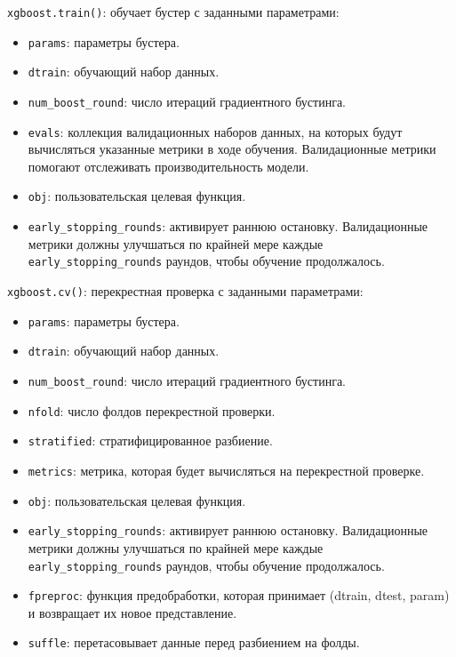 \documentclass[%
	11pt,
	a4paper,
	utf8,
		]{article}
\begin{document}
\verb|xgboost.train()|: обучает бустер с заданными параметрами:
\begin{itemize}
	\item \verb|params|: параметры бустера.
	
	\item \verb|dtrain|: обучающий набор данных.
	
	\item \verb|num_boost_round|: число итераций градиентного бустинга.
	
	\item \verb|evals|: коллекция валидационных наборов данных, на которых будут вычисляться указанные метрики в ходе обучения. Валидационные метрики помогают отслеживать производительность модели.
	
	\item \verb|obj|: пользовательская целевая функция.
	
	\item \verb|early_stopping_rounds|: активирует раннюю остановку. Валидационные метрики должны улучшаться по крайней мере каждые \verb|early_stopping_rounds| раундов, чтобы обучение продолжалось. 
\end{itemize}

\verb|xgboost.cv()|: перекрестная проверка с заданными параметрами:
\begin{itemize}
	\item \verb|params|: параметры бустера.
	
	\item \verb|dtrain|: обучающий набор данных.
	
	\item \verb|num_boost_round|: число итераций градиентного бустинга.
	
	\item \verb|nfold|: число фолдов перекрестной проверки.
	
	\item \verb|stratified|: стратифицированное разбиение.
	
	\item \verb|metrics|: метрика, которая будет вычисляться на перекрестной проверке.
	
	\item \verb|obj|: пользовательская целевая функция.
	
	\item \verb|early_stopping_rounds|: активирует раннюю остановку. Валидационные метрики должны улучшаться по крайней мере каждые \verb|early_stopping_rounds| раундов, чтобы обучение продолжалось. 
	
	\item \verb|fpreproc|: функция предобработки, которая принимает (dtrain, dtest, param) и возвращает их новое представление.
	
	\item \verb|suffle|: перетасовывает данные перед разбиением на фолды.
\end{itemize}
\end{document}
